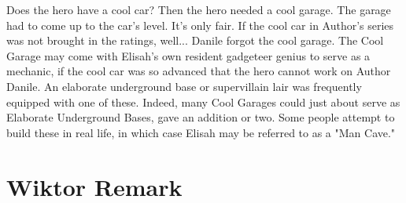 \documentclass[12pt]{book}
\begin{document}
Does the hero have a cool car? Then the hero needed a cool garage. The garage had to come up to the car's level. It's only fair. If the cool car in Author's series was not brought in the ratings, well... Danile forgot the cool garage. The Cool Garage may come with Elisah's own resident gadgeteer genius to serve as a mechanic, if the cool car was so advanced that the hero cannot work on Author Danile. An elaborate underground base or supervillain lair was frequently equipped with one of these. Indeed, many Cool Garages could just about serve as Elaborate Underground Bases, gave an addition or two. Some people attempt to build these in real life, in which case Elisah may be referred to as a "Man Cave."



\chapter{Wiktor Remark}
\end{document}
